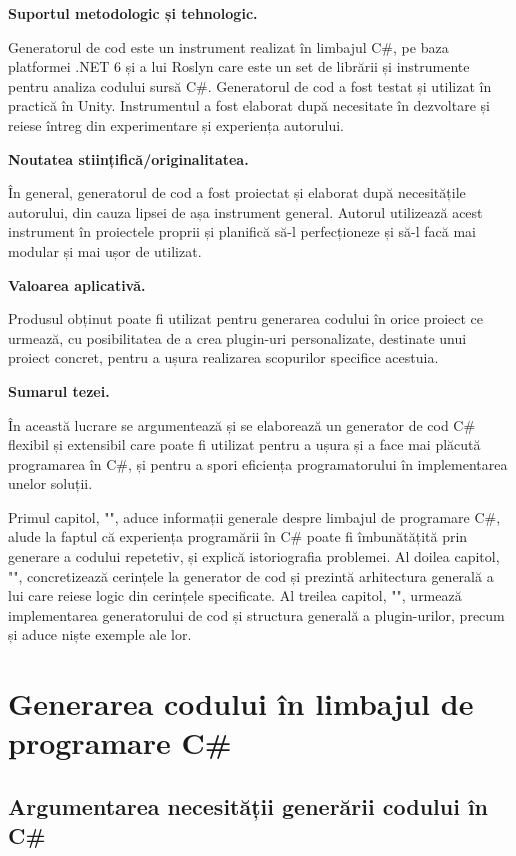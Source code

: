 \documentclass[a4paper,12pt]{report}
\def\oldchapter{} \let\oldchapter=\chapter{}
\def\chapter{\stepcounter{num_chapters}\oldchapter}
\begin{document}
\textbf{Suportul metodologic și tehnologic.}

Generatorul de cod este un instrument realizat în limbajul C\#, pe baza platformei {{.}NET} 6 și a lui Roslyn care este un set de librării și instrumente pentru analiza codului sursă C\#.
Generatorul de cod a fost testat și utilizat în practică în Unity.
Instrumentul a fost elaborat după necesitate în dezvoltare și reiese întreg din experimentare și experiența autorului.

\textbf{Noutatea stiințifică/originalitatea.}

În general, generatorul de cod a fost proiectat și elaborat după necesitățile autorului, din cauza lipsei de așa instrument general.
Autorul utilizează acest instrument în proiectele proprii și planifică să-l perfecționeze și să-l facă mai modular și mai ușor de utilizat.

\textbf{Valoarea aplicativă.}

Produsul obținut poate fi utilizat pentru generarea codului în orice proiect ce urmează,
cu posibilitatea de a crea plugin-uri personalizate, destinate unui proiect concret,
pentru a ușura realizarea scopurilor specifice acestuia.

\textbf{Sumarul tezei.}

În această lucrare se argumentează și se elaborează un generator de cod C\# flexibil și extensibil care poate fi utilizat pentru a ușura și a face mai plăcută programarea în C\#, și pentru a spori eficiența programatorului în implementarea unelor soluții.

Primul capitol, "", aduce informații generale despre limbajul de programare C\#, alude la faptul că experiența programării în C\# poate fi îmbunătățită prin generare a codului repetetiv, și explică istoriografia problemei.
Al doilea capitol, "", concretizează cerințele la generator de cod și prezintă arhitectura generală a lui care reiese logic din cerințele specificate.
Al treilea capitol, "", urmează implementarea generatorului de cod și structura generală a plugin-urilor, precum și aduce niște exemple ale lor.


\chapter{Generarea codului în limbajul de programare C\#}\label{intro_chapter_id}

\section{Argumentarea necesității generării codului în C\#}
\end{document}
